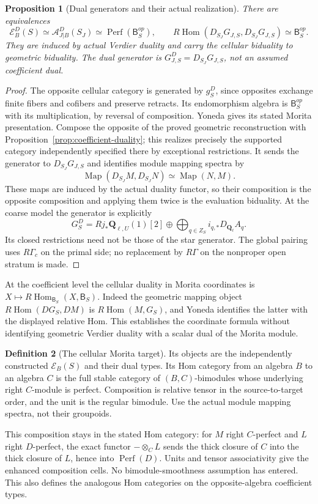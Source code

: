 \documentclass[11pt]{article}
\newtheorem{proposition}{Proposition}[section]
\theoremstyle{definition}
\newtheorem{definition}[proposition]{Definition}
\theoremstyle{remark}
\newcommand{\Q}{\mathbf Q_\ell}
\newcommand{\RHom}{R\operatorname{Hom}}
\newcommand{\Perf}{\operatorname{Perf}}
\begin{document}
\begin{proposition}[Dual generators and their actual realization]
\label{thm:dual-cellular}
There are equivalences
\[
 \mathcal E_B^D(S)\simeq\mathcal A^D_{J|B}(S_J)
       \simeq\Perf(\mathsf B_S^{op}),\qquad
 \RHom(D_{S_J}G_{J,S},D_{S_J}G_{J,S})\simeq\mathsf B_S^{op}.
\]
They are induced by actual Verdier duality and carry the cellular
biduality to geometric biduality.  The dual generator is
$G_{J,S}^D=D_{S_J}G_{J,S}$, not an assumed coefficient dual.
\end{proposition}
\begin{proof}
The opposite cellular category is generated by $g_S^D$, since
opposites exchange finite fibers and cofibers and preserve retracts.
Its endomorphism algebra is $\mathsf B_S^{op}$ with its multiplication,
by reversal of composition.  Yoneda gives its stated Morita
presentation.  Compose the opposite of the proved geometric
reconstruction with Proposition~\ref{prop:coefficient-duality}; this
realizes precisely the supported category independently specified
there by exceptional restrictions.  It sends the generator to
$D_{S_J}G_{J,S}$ and identifies module mapping spectra by
\[
 \operatorname{Map}(D_{S_J}M,D_{S_J}N)
                  \simeq\operatorname{Map}(N,M).
\]
These maps are induced by the actual duality functor, so their
composition is the opposite composition and applying them twice is
the evaluation biduality.  At the coarse model the generator is
explicitly
\[
 G_S^D=Rj_*\mathbf Q_{\ell,U}(1)[2]\oplus
                   \bigoplus_{q\in Z_S}i_{q,*}D_{\Q}A_q.
\]
Its closed restrictions need not be those of the star generator.
The global pairing uses $R\Gamma_c$ on the primal side; no replacement
by $R\Gamma$ on the nonproper open stratum is made.
\end{proof}

At the coefficient level the cellular duality in Morita coordinates is
$X\mapsto\RHom_{\mathsf B_S}(X,\mathsf B_S)$.
Indeed the geometric mapping object
$\RHom(DG_S,DM)$ is $\RHom(M,G_S)$, and Yoneda identifies the latter
with the displayed relative Hom.  This establishes the coordinate
formula without identifying geometric Verdier duality with a scalar
dual of the Morita module.

\begin{definition}[The cellular Morita target]\label{def:morita-target}
Its objects are the independently constructed $\mathcal E_B(S)$ and
their dual types.  Its Hom category from an algebra $B$ to an algebra
$C$ is the full stable category of $(B,C)$-bimodules whose underlying
right $C$-module is perfect.  Composition is relative tensor in the
source-to-target order, and the unit is the regular bimodule.
Use the actual module mapping spectra, not their groupoids.
\end{definition}
This composition stays in the stated Hom category: for $M$ right
$C$-perfect and $L$ right $D$-perfect, the exact functor
$-\otimes_C L$ sends the thick closure of $C$ into the thick closure
of $L$, hence into $\Perf(D)$.  Units and tensor associativity give
the enhanced composition cells.  No bimodule-smoothness assumption
has entered.  This also defines the analogous Hom categories on the
opposite-algebra coefficient types.
\end{document}
